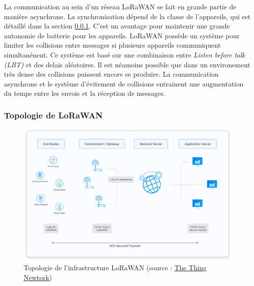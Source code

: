 \vspace{0.1cm}

La communication au sein d'un réseau LoRaWAN se fait en grande partie de manière asynchrone. La synchronisation dépend de la classe de l'appareils, qui est détaillé dans la section \ref{topolora}. C'est un avantage pour maintenir une grande autonomie de batterie pour les appareils. LoRaWAN possède un système pour limiter les collisions entre messages si plusieurs appareils communiquent simultanénent. Ce système est basé sur une combinaison entre \textit{Listen before talk (LBT)} et des delais aléatoires\cite{loracolision}. Il est néamoins possible que dans un environement très dense des collisions puissent encore se produire. La communication asynchrone et le système d'évitement de collisions entrainent une augmentation du temps entre les envois et la réception de messages.

\subsubsection{Topologie de LoRaWAN}\label{topolora}

\begin{figure}[h]
\centering

\includegraphics[scale=0.1]{images/architecture.png}
\caption{Topologie de l'infrastructure LoRaWAN (source : \href{https://www.thethingsnetwork.org/docs/lorawan/architecture/}{The Thing Newtork})}\label{term7}
\end{figure}


